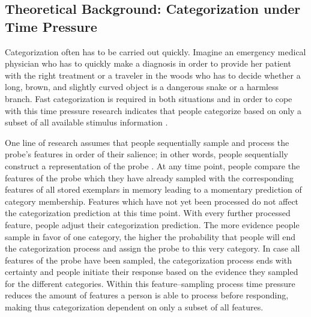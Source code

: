 \documentclass[a4paper,man,natbib]{apa6}
\begin{document}

\subsection{Theoretical Background: Categorization under Time Pressure}
Categorization often has to be carried out quickly. Imagine an emergency medical physician who has to quickly make a diagnosis in order to provide her patient with the right treatment or a traveler in the woods who has to decide whether a long, brown, and slightly curved object is a dangerous snake or a harmless branch. Fast categorization is required in both situations and in order to cope with this time pressure research indicates that people categorize based on only a subset of all available stimulus information \citep{lamberts1995categorization}. 

One line of research assumes that people sequentially sample and process the probe's features in order of their salience; in other words, people sequentially construct a representation of the probe \citep{lamberts1995categorization, lamberts2000information, lamberts2002feature}. At any time point, people compare the features of the probe which they have already sampled with the corresponding features of all stored exemplars in memory leading to a momentary prediction of category membership. Features which have not yet been processed do not affect the categorization prediction at this time point. With every further processed feature, people adjust their categorization prediction. The more evidence people sample in favor of one category, the higher the probability that people will end the categorization process and assign the probe to this very category. In case all features of the probe have been sampled, the categorization process ends with certainty and people initiate their response based on the evidence they sampled for the different categories. Within this feature--sampling process time pressure reduces the amount of features a person is able to process before responding, making thus categorization dependent on only a subset of all features. 
\end{document}
